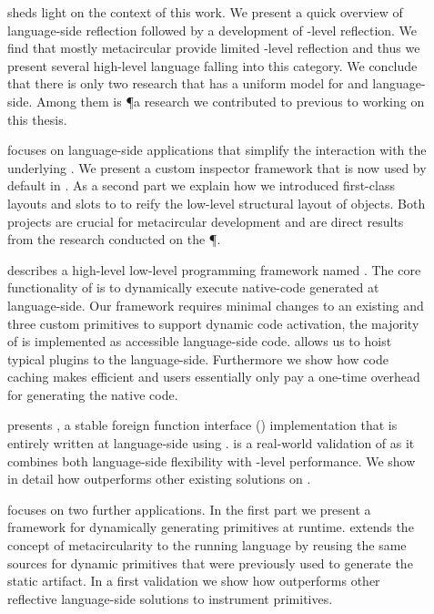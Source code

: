 \begin{description}

\item[] sheds light on the context of this work.
	We present a quick overview of language-side reflection followed by a development of \VM-level reflection.
	We find that mostly metacircular \VMs provide limited \VM-level reflection and thus we present several high-level language \VMs falling into this category.
	We conclude that there is only two research \VM that has a uniform model for \VM and language-side.
	Among them is \P a research \ST \VM we contributed to previous to working on this thesis.

\item[] focuses on language-side applications that simplify the interaction with the underlying \VM.
	We present a custom inspector framework that is now used by default in \PH.
	As a second part we explain how we introduced first-class layouts and slots to \PH to reify the low-level structural layout of objects.
	Both projects are crucial for metacircular \VM development and are direct results from the research conducted on the \P \VM.

\item[] describes a high-level low-level programming framework named \B.
	The core functionality of \B is to dynamically execute native-code generated at language-side.
	Our framework requires minimal changes to an existing \VM and three custom primitives to support dynamic code activation, the majority of \B is implemented as accessible language-side code.
	\B allows us to hoist typical \VM plugins to the language-side.
	Furthermore we show how code caching makes \B efficient and users essentially only pay a one-time overhead for generating the native code.
	
\item[] presents \NB, a stable foreign function interface (\FFI) implementation that is entirely written at language-side using \B.
	\NB is a real-world validation of \B as it combines both language-side flexibility with \VM-level performance.
	We show in detail how \NB outperforms other existing \FFI solutions on \PH.

\item[] focuses on two further \B applications.
	In the first part we present \WF a framework for dynamically generating primitives at runtime.
	\WF extends the concept of metacircularity to the running language by reusing the same sources for dynamic primitives that were previously used to generate the static \VM artifact.
	In a first validation we show how \WF outperforms other reflective language-side solutions to instrument primitives.
	

\end{description}
